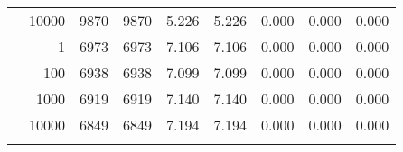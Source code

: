 \begin{table}
\begin{tabular}{rrrrrrrrr}
	            
					 &  
					 
					\multirow{ 1 }{*}{ 10000 } &
					
						
							    
							     9870  & 9870  
	                           & 5.226 & 5.226 & 0.000
	                           & 0.000 & 0.000  \\
	                
	            
	        
				\noalign{\smallskip}\hline
				\multirow{ 4 }{*}{ 500000 } &
				
					
					 
					\multirow{ 1 }{*}{ 1 } &
					
						
							    
							     6973  & 6973  
	                           & 7.106 & 7.106 & 0.000
	                           & 0.000 & 0.000  \\
	                
	            
					 &  
					 
					\multirow{ 1 }{*}{ 100 } &
					
						
							    
							     6938  & 6938  
	                           & 7.099 & 7.099 & 0.000
	                           & 0.000 & 0.000  \\
	                
	            
					 &  
					 
					\multirow{ 1 }{*}{ 1000 } &
					
						
							    
							     6919  & 6919  
	                           & 7.140 & 7.140 & 0.000
	                           & 0.000 & 0.000  \\
	                
	            
					 &  
					 
					\multirow{ 1 }{*}{ 10000 } &
					
						
							    
							     6849  & 6849  
	                           & 7.194 & 7.194 & 0.000
	                           & 0.000 & 0.000  \\
	                
	            
	        
				\noalign{\smallskip}\hline
				\multirow{ 4 }{*}{ 1000000 } &
				
					
					 

\end{tabular}
\end{table}
